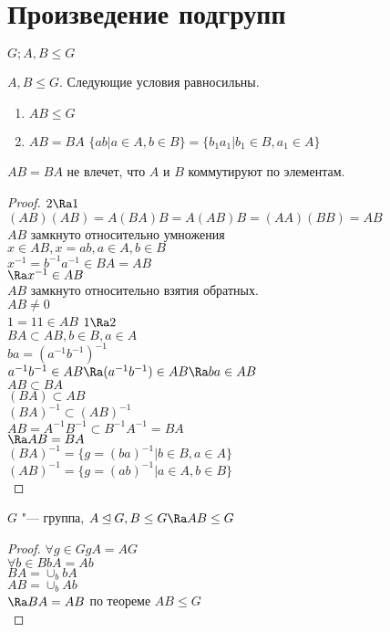 ﻿\section{Произведение подгрупп}
$G; A, B \le G$\\
\begin{theorem}
$A, B \le G$. Следующие условия равносильны.\\
    \begin{enumerate}
    \item $AB \le G$\\
    \item $AB = BA$
    $\{ab | a \in  A, b \in B\} = \{b_1a_1 | b_1 \in B, a_1 \in A\}$\\
    \end{enumerate}
\end{theorem}
\begin{Rem}
$AB = BA$ не влечет, что $A$ и $B$ коммутируют по элементам.
\end{Rem}
\begin{proof}
$2 \Ra 1$\\
$(AB)(AB) = A(BA)B = A(AB)B = (AA)(BB) = AB$\\
$AB$ замкнуто относительно умножения\\
$x \in AB, x = ab, a\in A, b \in B$\\
$x^{-1} = b^{-1}a^{-1} \in BA = AB$\\
$\Ra x^{-1} \in AB$\\

$AB$ замкнуто относительно взятия обратных.\\
$AB \ne 0$\\
$1 = 11 \in AB$
$1 \Ra 2$\\
$BA \subset AB, b \in B, a \in A$\\
$ba = (a^{-1}b^{-1})^{-1}$\\
$a^{-1}b^{-1} \in AB \Ra (a^{-1}b^{-1}) \in AB \Ra ba \in AB$\\

$AB \subset BA$\\
$(BA) \subset AB$\\
$(BA)^{-1} \subset (AB)^{-1}$\\
$AB = A^{-1}B^{-1} \subset B^{-1}A^{-1} = BA$\\
$\Ra AB = BA$\\

$(BA)^{-1} = \{g = (ba)^{-1}|b \in B, a \in A\}$\\
$(AB)^{-1} = \{g = (ab)^{-1}|a \in A, b \in B\}$\\
\end{proof}
\begin{conseq}
$G$ "--- группа, $A \unlhd G, B \le G \Ra AB \le G$ \\
\end{conseq}
\begin{proof}
$\forall g \in G gA = AG$\\
$\forall b \in B bA = Ab$\\

$BA = \cup_b bA$\\
$AB = \cup_b Ab$\\
$\Ra BA = AB$ по теореме $AB \le G$\\
\end{proof}